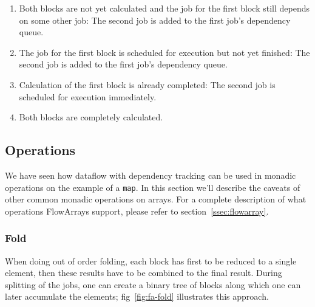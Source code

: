 \documentclass[runningheads,a4paper,fleqn]{llncs}
\begin{document}
\begin{enumerate}
\item Both blocks are not yet calculated and the job for the first
  block still depends on some other job: The second job is added to
  the first job's dependency queue.
\item The job for the first block is scheduled for execution but not
  yet finished: The second job is added to the first job's dependency
  queue.
\item Calculation of the first block is already completed: The second
  job is scheduled for execution immediately.
\item Both blocks are completely calculated.
\end{enumerate}

\subsection{Operations}
We have seen how dataflow with dependency tracking can be used in
monadic operations on the example of a \texttt{map}. In this section
we'll describe the caveats of other common monadic operations on
arrays. For a complete description of what operations FlowArrays
support, please refer to section~\ref{ssec:flowarray}.

\subsubsection{Fold}
When doing out of order folding, each block has first to be reduced to
a single element, then these results have to be combined to the final
result. During splitting of the jobs, one can create a binary tree of
blocks along which one can later accumulate the elements;
fig~\ref{fig:fa-fold} illustrates this approach.
\end{document}
